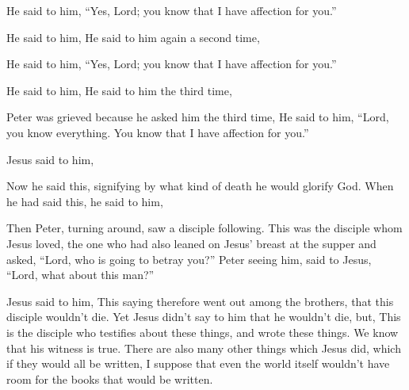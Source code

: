 {\par }{\PP He said to him, “Yes, Lord; you know that I have affection for you.”
\par }{\PP He said to him,
{}
He said to him again a second time,
{}
\par }{\PP He said to him, “Yes, Lord; you know that I have affection for you.”
\par }{\PP He said to him,
{}
He said to him the third time,
{}
\par }{\PP Peter was grieved because he asked him the third time,
{} He said to him, “Lord, you know everything. You know that I have affection for you.”
\par }{\PP Jesus said to him,
{}
\par }{\PP {}Now he said this, signifying by what kind of death he would glorify God. When he had said this, he said to him,
{}
\par }{\PP {}Then Peter, turning around, saw a disciple following. This was the disciple whom Jesus loved, the one who had also leaned on Jesus’ breast at the supper and asked, “Lord, who is going to betray you?”
Peter seeing him, said to Jesus, “Lord, what about this man?”
\par }{\PP {}Jesus said to him,
{}
This saying therefore went out among the brothers, that this disciple wouldn’t die. Yet Jesus didn’t say to him that he wouldn’t die, but,
{}
This is the disciple who testifies about these things, and wrote these things. We know that his witness is true.
There are also many other things which Jesus did, which if they would all be written, I suppose that even the world itself wouldn’t have room for the books that would be written.
\par }
